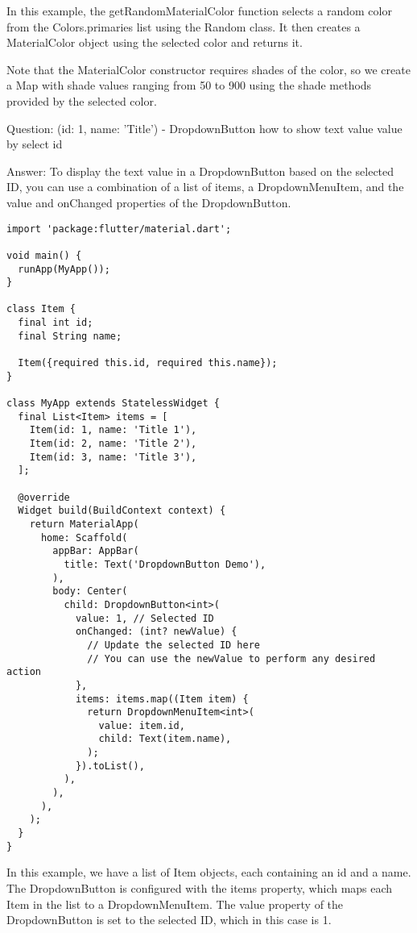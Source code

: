 In this example, the getRandomMaterialColor function selects a random color from the Colors.primaries list using the 
Random class. It then creates a MaterialColor object using the selected color and returns it.

Note that the MaterialColor constructor requires shades of the color, so we create a Map with shade values ranging 
from 50 to 900 using the shade methods provided by the selected color.

Question: (id: 1, name: 'Title') - DropdownButton how to show text value value by select id

Answer: To display the text value in a DropdownButton based on the selected ID, you can use a combination of a list 
of items, a DropdownMenuItem, and the value and onChanged properties of the DropdownButton.

\begin{lstlisting}
import 'package:flutter/material.dart';

void main() {
  runApp(MyApp());
}

class Item {
  final int id;
  final String name;

  Item({required this.id, required this.name});
}

class MyApp extends StatelessWidget {
  final List<Item> items = [
    Item(id: 1, name: 'Title 1'),
    Item(id: 2, name: 'Title 2'),
    Item(id: 3, name: 'Title 3'),
  ];

  @override
  Widget build(BuildContext context) {
    return MaterialApp(
      home: Scaffold(
        appBar: AppBar(
          title: Text('DropdownButton Demo'),
        ),
        body: Center(
          child: DropdownButton<int>(
            value: 1, // Selected ID
            onChanged: (int? newValue) {
              // Update the selected ID here
              // You can use the newValue to perform any desired action
            },
            items: items.map((Item item) {
              return DropdownMenuItem<int>(
                value: item.id,
                child: Text(item.name),
              );
            }).toList(),
          ),
        ),
      ),
    );
  }
}
\end{lstlisting}

In this example, we have a list of Item objects, each containing an id and a name. The DropdownButton is configured 
with the items property, which maps each Item in the list to a DropdownMenuItem. The value property of the 
DropdownButton is set to the selected ID, which in this case is 1.

